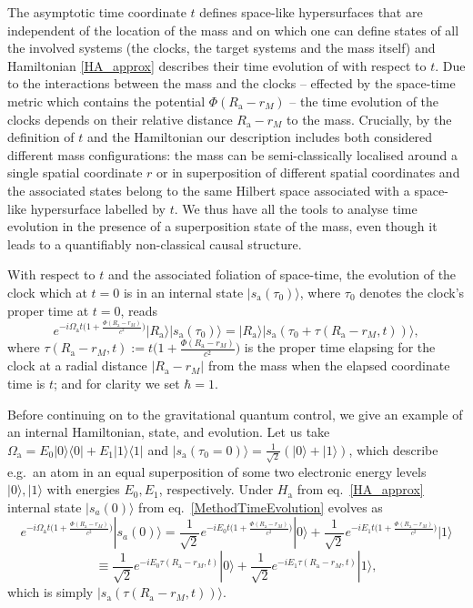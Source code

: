 \documentclass[a4paper,11pt]{article}
\newcommand{\bra}{\langle}
\newcommand{\ket}{\rangle}
\newcommand{\be}{\begin{equation}}
\newcommand{\ee}[1]{\label{#1} \end{equation}}
\begin{document}
The asymptotic time coordinate $t$ defines space-like hypersurfaces that are independent of the location of the mass and on which one can define states of all the involved systems (the clocks, the target systems and the mass itself) and Hamiltonian \eqref{HA_approx} describes their time evolution of with respect to $t$. Due to the interactions between the mass and the clocks  -- effected by the space-time metric which contains the potential $\Phi(R_\mathrm{a}-r_M)$ -- the time evolution of the clocks depends on their relative distance $R_\mathrm{a}-r_M$ to the mass.  Crucially, by the definition of $t$ and the Hamiltonian our description includes both considered different mass configurations: the mass can be semi-classically localised around a single spatial coordinate $r$ or in superposition of different spatial coordinates and the associated states belong to the same Hilbert space associated with a space-like hypersurface labelled by $t$. We thus  have all the  tools to analyse time evolution in the presence of a superposition state of the mass, even though it leads to a quantifiably non-classical causal structure.

With respect to $t$ and the associated foliation of space-time, the evolution of the clock which at $t=0$ is in an internal state $|{s_\mathrm{a}(\tau_0)}\ket$, where $\tau_0$ denotes the clock's proper time at $t=0$, reads 
\be
e^{-i\Omega_\mathrm{a}t\big(1+\frac{\Phi(R_\mathrm{a}-r_M)}{c^2}\big)}|R_\mathrm{a}\ket|{s_\mathrm{a}(\tau_0)}\ket=|R_\mathrm{a}\ket|{s_\mathrm{a}(\tau_0+\tau(R_\mathrm{a}-r_M, t))}\ket,
\ee{MethodTimeEvolution} 
where $\tau(R_\mathrm{a}-r_M, t) := t\big(1+\frac{\Phi(R_\mathrm{a}-r_M)}{c^2}\big)$ is the proper time elapsing for the clock at a radial distance $|R_\mathrm{a}-r_M|$ from the mass when the elapsed coordinate time is $t$;  and for clarity we set $\hbar=1$.

Before continuing on to the gravitational quantum control, we give an example of an internal Hamiltonian, state, and evolution. Let us take  $\Omega_\mathrm{a} =E_0|0\ket\bra0|+E_1|1\ket\bra1|$ and $|s_\mathrm{a}(\tau_0=0)\ket=\frac{1}{\sqrt{2}}(|0\ket+|1\ket)$, which describe e.g.~an atom in an equal superposition of some two electronic energy levels $|0\ket, |1\ket$ with energies $E_0, E_1$, respectively. Under $H_\mathrm{a}$ from eq.~\eqref{HA_approx} internal state $|s_a(0)\ket$ from eq.~\eqref{MethodTimeEvolution} evolves as $$e^{-i\Omega_\mathrm{a}t\big(1+\frac{\Phi(R_\mathrm{a}-r_M)}{c^2}\big)}|s_a(0)\ket=\frac{1}{\sqrt{2}}e^{-iE_0t\big(1+\frac{\Phi(R_\mathrm{a}-r_M)}{c^2}\big)}|0\ket+\frac{1}{\sqrt{2}}e^{-iE_1t\big(1+\frac{\Phi(R_\mathrm{a}-r_M)}{c^2}\big)}|1\ket$$
$$\equiv \frac{1}{\sqrt{2}}e^{-iE_0\tau(R_\mathrm{a}-r_M, t)}|0\ket+\frac{1}{\sqrt{2}}e^{-iE_1\tau(R_\mathrm{a}-r_M, t)}|1\ket,$$ which is simply  $|s_\mathrm{a}(\tau(R_\mathrm{a}-r_M, t))\ket$.
\end{document}
